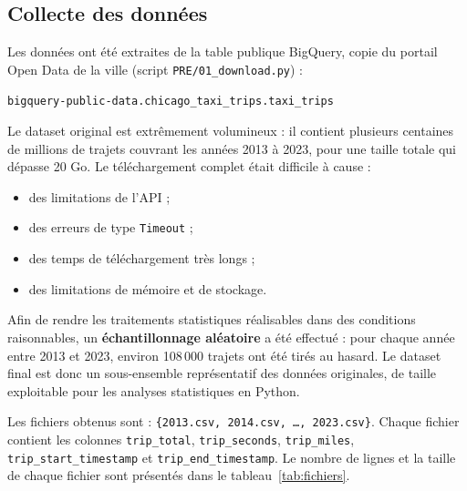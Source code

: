\documentclass[11pt,a4paper]{article}
\begin{document}
\subsection{Collecte des données}

Les données ont été extraites de la table publique BigQuery, copie du portail Open Data de la ville
(script \texttt{PRE/01\_download.py}) :
\begin{center}\texttt{bigquery-public-data.chicago\_taxi\_trips.taxi\_trips}\end{center}

Le dataset original est extrêmement volumineux : il contient plusieurs centaines de millions de trajets
couvrant les années 2013 à 2023, pour une taille totale qui dépasse 20 Go. Le téléchargement complet était
difficile à cause :
\begin{itemize}
  \item des limitations de l'API ;
  \item des erreurs de type \texttt{Timeout} ;
  \item des temps de téléchargement très longs ;
  \item des limitations de mémoire et de stockage.
\end{itemize}

Afin de rendre les traitements statistiques réalisables dans des conditions raisonnables, un
\textbf{échantillonnage aléatoire} a été effectué : pour chaque année entre 2013 et 2023, environ 108\,000
trajets ont été tirés au hasard. Le dataset final est donc un sous-ensemble représentatif des données
originales, de taille exploitable pour les analyses statistiques en Python.

Les fichiers obtenus sont : \texttt{\{2013.csv, 2014.csv, \ldots, 2023.csv\}}. Chaque fichier contient les
colonnes \texttt{trip\_total}, \texttt{trip\_seconds}, \texttt{trip\_miles}, \texttt{trip\_start\_\allowbreak timestamp}
et \texttt{trip\_end\_timestamp}. Le nombre de lignes et la taille de chaque fichier sont présentés dans le
tableau~\ref{tab:fichiers}.
\end{document}
